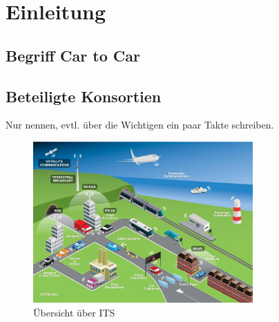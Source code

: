 \chapter{Einleitung \label{chap_einleitung}}

\section{Begriff Car to Car}

\section{Beteiligte Konsortien}
Nur nennen, evtl. über die Wichtigen ein paar Takte schreiben.

\begin{figure}[h]
	\includegraphics[width=0.75\textwidth]{content/images/00_einleitung/ETSI_ITS_09_2012.jpg}
	\caption{Übersicht über ITS \cite{ITS_vorstellung}}
	\label{fig:itsVorstellung}
\end{figure}